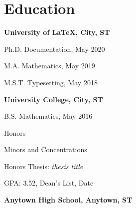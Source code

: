 \section{\sc Education}

{\bf University of LaTeX, City, ST}\\
\vspace*{-.1in}
\begin{list1}
\item[] Ph.D. Documentation, May 2020
\item[] M.A. Mathematics, May 2019
\item[] M.S.T. Typesetting, May 2018
\end{list1}



{\bf University College, City, ST}\\
\vspace*{-.1in}
\begin{list1}
\item[] B.S. Mathematics, May 2016 %

\begin{list2}
\vspace*{.05in}
\item Honors
\item Minors and Concentrations
\item Honors Thesis: \emph{thesis title}

\item GPA: 3.52, Dean's List, Date
\end{list2}
\end{list1}

{\bf Anytown High School, Anytown, ST}

\endinput